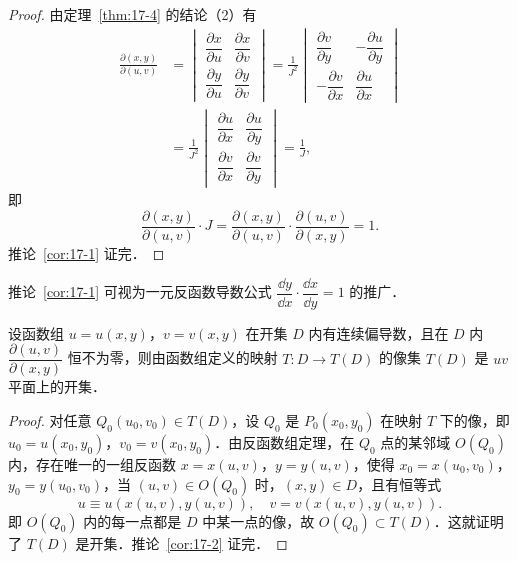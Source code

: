 \begin{proof}
由定理~\ref{thm:17-4} 的结论（2）有
\[
\begin{aligned}
\frac{\partial(x,y)}{\partial(u,v)}&=\begin{vmatrix}\dfrac{\partial x}{\partial u}&\dfrac{\partial x}{\partial v}\\[8pt]\dfrac{\partial y}{\partial u}&\dfrac{\partial y}{\partial v}\end{vmatrix}=\frac{1}{J^{2}}\begin{vmatrix}\dfrac{\partial v}{\partial y}&-\dfrac{\partial u}{\partial y}\\[8pt]-\dfrac{\partial v}{\partial x}&\dfrac{\partial u}{\partial x}\end{vmatrix}\\
&=\frac{1}{J^{2}}\begin{vmatrix}\dfrac{\partial u}{\partial x}&\dfrac{\partial u}{\partial y}\\[8pt]\dfrac{\partial v}{\partial x}&\dfrac{\partial v}{\partial y}\end{vmatrix}=\frac{1}{J},
\end{aligned}
\]
即
\[
\frac{\partial(x,y)}{\partial(u,v)}\cdot J=\frac{\partial(x,y)}{\partial(u,v)}\cdot\frac{\partial(u,v)}{\partial(x,y)}=1.
\]
推论~\ref{cor:17-1} 证完．
\end{proof}

推论~\ref{cor:17-1} 可视为一元反函数导数公式 $\dfrac{\dd y}{\dd x}\cdot\dfrac{\dd x}{\dd y}=1$ 的推广．

\begin{corollary}\label{cor:17-2}
设函数组 $u=u(x,y)$，$v=v(x,y)$ 在开集 $D$ 内有连续偏导数，且在 $D$ 内 $\dfrac{\partial(u,v)}{\partial(x,y)}$ 恒不为零，则由函数组定义的映射 $T:D\to T(D)$ 的像集 $T(D)$ 是 $uv$ 平面上的开集．
\end{corollary}

\begin{proof}
对任意 $Q_{0}(u_{0},v_{0})\in T(D)$，设 $Q_{0}$ 是 $P_{0}(x_{0},y_{0})$ 在映射 $T$ 下的像，即 $u_{0}=u(x_{0},y_{0})$，$v_{0}=v(x_{0},y_{0})$．由反函数组定理，在 $Q_{0}$ 点的某邻域 $O(Q_{0})$ 内，存在唯一的一组反函数 $x=x(u,v)$，$y=y(u,v)$，使得 $x_{0}=x(u_{0},v_{0})$，$y_{0}=y(u_{0},v_{0})$，当 $(u,v)\in O(Q_{0})$ 时，$(x,y)\in D$，且有恒等式
\[
u\equiv u(x(u,v),y(u,v)),\quad v=v(x(u,v),y(u,v)).
\]
即 $O(Q_{0})$ 内的每一点都是 $D$ 中某一点的像，故 $O(Q_{0})\subset T(D)$．这就证明了 $T(D)$ 是开集．推论~\ref{cor:17-2} 证完．
\end{proof}

